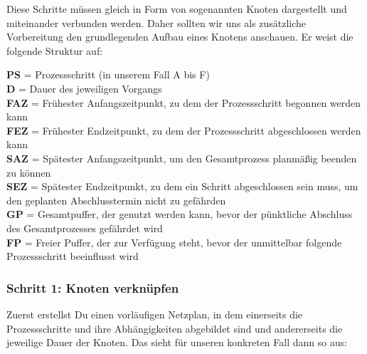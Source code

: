 Diese Schritte müssen gleich in Form von sogenannten Knoten dargestellt und miteinander verbunden werden. Daher sollten wir uns als zusätzliche Vorbereitung den grundlegenden Aufbau eines Knotens anschauen. Er weist die folgende Struktur auf:

\begin{center}
\end{center}

\textbf{PS} = Prozessschritt (in unserem Fall A bis F)\\
\textbf{D} = Dauer des jeweiligen Vorgangs\\
\textbf{FAZ} = Frühester Anfangszeitpunkt, zu dem der Prozessschritt begonnen werden kann\\
\textbf{FEZ} = Frühester Endzeitpunkt, zu dem der Prozessschritt abgeschlossen werden kann\\
\textbf{SAZ} = Spätester Anfangszeitpunkt, um den Gesamtprozess planmäßig beenden zu können\\
\textbf{SEZ} = Spätester Endzeitpunkt, zu dem ein Schritt abgeschlossen sein muss, um den geplanten Abschlusstermin nicht zu gefährden\\
\textbf{GP} = Gesamtpuffer, der genutzt werden kann, bevor der pünktliche Abschluss des Gesamtprozesses gefährdet wird\\
\textbf{FP} = Freier Puffer, der zur Verfügung steht, bevor der unmittelbar folgende Prozessschritt beeinflusst wird\\

\subsubsection{Schritt 1: Knoten verknüpfen}

Zuerst erstellst Du einen vorläufigen Netzplan, in dem einerseits die Prozessschritte und ihre Abhängigkeiten abgebildet sind und andererseits die jeweilige Dauer der Knoten. Das sieht für unseren konkreten Fall dann so aus:

